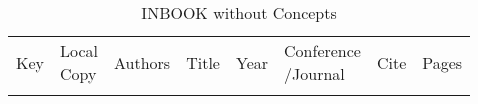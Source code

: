 {\scriptsize
\begin{longtable}{llp{5cm}p{10cm}rp{3cm}lr}
\rowcolor{white}\caption{INBOOK without Concepts}\\ \toprule
\rowcolor{white}Key & \shortstack{Local\\Copy} & Authors & Title & Year & \shortstack{Conference\\/Journal} & Cite & Pages\\ \midrule
\endhead
\bottomrule
\endfoot
\end{longtable}
}

